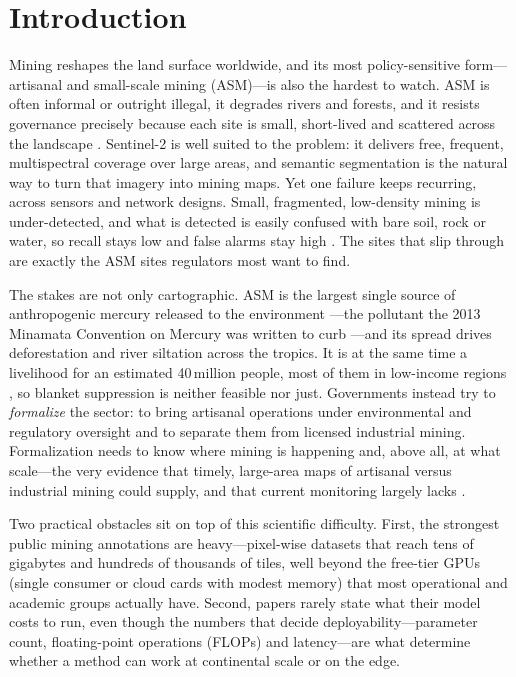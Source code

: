 \documentclass[review]{elsarticle}
\begin{document}
\section{Introduction}\label{sec:intro}

Mining reshapes the land surface worldwide, and its most policy-sensitive form---artisanal
and small-scale mining (ASM)---is also the hardest to watch. ASM is often informal or
outright illegal, it degrades rivers and forests, and it resists governance precisely
because each site is small, short-lived and scattered across the landscape
\citep{maus2022global}. Sentinel-2 \citep{drusch2012sentinel2} is well suited
to the problem: it delivers free, frequent, multispectral coverage over large areas, and
semantic segmentation is the natural way to turn that imagery into mining maps. Yet one
failure keeps recurring, across sensors and network designs. Small, fragmented, low-density
mining is under-detected, and what is detected is easily confused with bare soil, rock or
water, so recall stays low and false alarms stay high
\citep{gallwey2020asm}. The sites that slip through are exactly the ASM
sites regulators most want to find.

The stakes are not only cartographic. ASM is the largest single source of anthropogenic
mercury released to the environment \citep{unep2019mercury}---the pollutant the \num{2013}
Minamata Convention on Mercury was written to curb \citep{minamata2013}---and its spread
drives deforestation and river siltation across the tropics. It is at the same time a
livelihood for an estimated \num{40}\,million people, most of them in low-income regions
\citep{igf2018asm}, so blanket suppression is neither feasible nor just. Governments instead
try to \emph{formalize} the sector: to bring artisanal operations under environmental and
regulatory oversight and to separate them from licensed industrial mining. Formalization
needs to know where mining is happening and, above all, at what scale---the very evidence
that timely, large-area maps of artisanal versus industrial mining could supply, and that
current monitoring largely lacks \citep{nursamsi2024review}.

Two practical obstacles sit on top of this scientific difficulty. First, the strongest
public mining annotations are heavy---pixel-wise datasets that reach tens of gigabytes and
hundreds of thousands of tiles, well beyond the free-tier GPUs (single consumer or cloud
cards with modest memory) that most operational and academic groups actually have. Second,
papers rarely state what their model costs to run, even though the numbers that decide
deployability---parameter count, floating-point operations (FLOPs) and latency---are what
determine whether a method can work at continental scale or on the edge.
\end{document}
